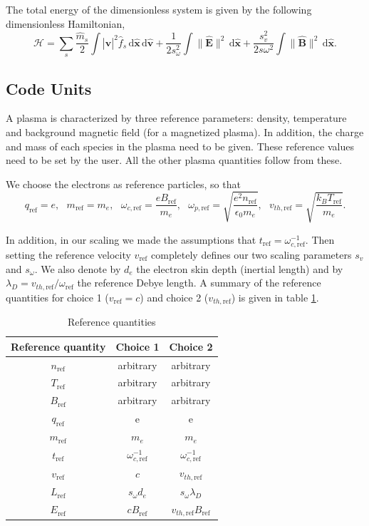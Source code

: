 \documentclass[english]{article}
\newcommand{\bx}{\textbf{x}}
\newcommand{\bv}{\textbf{v}}
\newcommand{\bB}{\textbf{B}}
\newcommand{\bE}{\textbf{E}}
\newcommand{\du}{\,\mathrm{d}}
\newcommand{\tr}{t_{\mathrm{ref}}}
\newcommand{\xr}{L_{\mathrm{ref}}}
\newcommand{\nr}{n_{\mathrm{ref}}}
\newcommand{\qr}{q_{\mathrm{ref}}}
\newcommand{\Tr}{T_{\mathrm{ref}}}
\newcommand{\mr}{m_{\mathrm{ref}}}
\newcommand{\Br}{B_{\mathrm{ref}}}
\newcommand{\Er}{E_{\mathrm{ref}}}
\newcommand{\vr}{v_{\mathrm{ref}}}
\newcommand{\vthr}{v_{th,\mathrm{ref}}}
\newcommand{\omr}{\omega_{\mathrm{ref}}}
\newcommand{\ompr}{\omega_{p,\mathrm{ref}}}
\newcommand{\omcr}{\omega_{c,\mathrm{ref}}}
\newcommand{\xht}{\hat{\bx}}
\newcommand{\vht}{\hat{\bv}}
\newcommand{\mht}{\hat{m}}
\newcommand{\Eht}{\hat{\bE}}
\newcommand{\Bht}{\hat{\bB}}
\newcommand{\fht}{\hat{f}}
\begin{document}
The total energy of the dimensionless system is given by the following dimensionless Hamiltonian, 
	\begin{equation}\label{eq:hamiltoniant}
	\mathcal{H}=\sum_s\frac{\mht_s}{2}\int |\vht|^2 \fht_s \du\xht \du\vht + \frac{1}{2s_\omega^2} \int \|\Eht\|^2 \du\xht + \frac{s_v^2}{2s\omega^2} \int \|\Bht\|^2 \du\xht.
	\end{equation}

	\subsection{Code Units}

A plasma is characterized by three reference parameters: density, temperature and background magnetic field (for a magnetized plasma). In addition, the charge and mass of each species in the plasma need to be given. These reference values need to be set by the user. All the other plasma quantities follow from these.

We choose the electrons as reference particles, so that
$$\qr = e, ~~~ \mr=m_e, ~~~ \omcr=\frac{e\Br}{m_e}, ~~~ \ompr=\sqrt{\frac{e^2\nr}{\epsilon_0m_e}}, ~~~ \vthr= \sqrt{\frac{k_B \Tr}{m_e}} .$$

In addition, in our scaling we made the assumptions that $\tr = \omcr^{-1}$. 
Then setting the reference velocity $\vr$ completely defines our two scaling parameters $s_v$ and $s_\omega$.
We also denote by $d_e$ the electron skin depth (inertial length) and by
$\lambda_D=\vthr/\omr$ the reference Debye length.
A summary of the reference quantities for choice 1 ($\vr=c$) and choice 2 ($\vthr$) is given in table \ref{tab:refq}.

\begin{table}[htbp]
	    \caption{Reference quantities \label{tab:refq}}
	\centering\begin{tabular}{c|c|c}
		Reference quantity & Choice 1 & Choice 2 \\ \hline
		$\nr$& arbitrary & arbitrary\\
		$\Tr$& arbitrary& arbitrary\\
		$\Br$& arbitrary& arbitrary\\
		$\qr$& e & e \\
		$\mr$& $m_e$  & $m_e$  \\
		$\tr$& $ \omcr^{-1}$ &$ \omcr^{-1}$\\
		$\vr$& $c$ &$\vthr$ \\ 
		$\xr$& $s_\omega d_e$ & $s_\omega \lambda_D$ \\
		$\Er$& $c\Br$ & $\vthr\Br$ \\
	\end{tabular}
\end{table}
\end{document}
